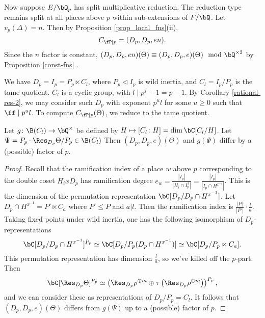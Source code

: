 Now suppose $E / \bQ_p$ has split multiplicative reduction. The reduction type remains split at all places above $p$ within sub-extensions of $F / \bQ$. Let $v_p(\Delta) = n$. Then by Proposition \ref{prop_local_fns}(ii), 
\[ C_{\fP \mid p} = (D_p, D_p, en). \]
Since the $n$ factor is constant, $(D_p, D_p, en)(\Theta) \equiv (D_p, D_p, e)(\Theta) \mod \bQ^{\times 2}$ by Proposition \ref{const-fns} .

We have $D_p = I_p = P_p \ltimes C_l$, where $P_p \triangleleft I_p$ is wild inertia, and $C_l = I_p / P_p$ is the tame quotient. $C_l$ is a cyclic group, with $l \mid p^f - 1 = p - 1$. By Corollary \ref{rational-res-2}, we may consider such $D_p$ with exponent  $p^u l$ for some $u \geq 0$ such that $\ff \mid p^u l$. To compute $C_{\fP \mid p}(\Theta)$, we reduce to the tame quotient.

\begin{lemma}
Let $g \colon \B(C_l) \to \bQ^{\times}$ be defined by $H \mapsto [C_l \colon H] = \dim \bC[C_l / H]$. Let $\Psi = P_p \cdot \Res_{D_p} \Theta / P_p \in \B(C_l)$ Then $(D_p, D_p, e)(\Theta)$ and $g(\Psi)$ differ by a (possible) factor of $p$. 
\end{lemma}

\begin{proof}
Recall that the ramification index of a place $w$ above $p$ corresponding to the double coset $H_i x D_p$ has ramification degree $e_w = \frac{|I_p|}{|H_i \cap I_p^x|} =\frac{|I_p|}{|I_p \cap H^{x^{-1}}|}$.
This is the dimension of the permutation representation $\bC[D_p / D_p \cap H^{x^{-1}}]$.
Let  $D_p \cap H^{x^{-1}} = P' \ltimes C_a$ where $P' \leq P$ and $a | l$. Then the ramification index is $\frac{|P|}{|P'|}\cdot \frac{l}{a}$. 
Taking fixed points under wild inertia, one has the following isomorphism of $D_p$-representations  $$\bC[D_p / D_p \cap H^{x^{-1}}]^{P_p} \simeq \bC[D_p / P_p (D_p \cap H^{x^{-1}})] \simeq \bC[D_p / P_p \ltimes C_a].$$ This permutation representation has dimension $\frac{l}{a}$, so we've killed off the $p$-part. 
Then $$\bC[\Res_{D_p} \Theta]^{P_p} \simeq \left(\Res_{D_p} \rho^{\oplus m} \oplus \tau\left(\Res_{D_p}\rho^{\oplus m}\right)\right)^{P_p},$$
and we can consider these as representations of $D_p / P_p = C_l$.
It follows that $(D_p, D_p, e)(\Theta)$ differs from $g(\Psi)$ up to a (possible) factor of $p$. 
\end{proof}

